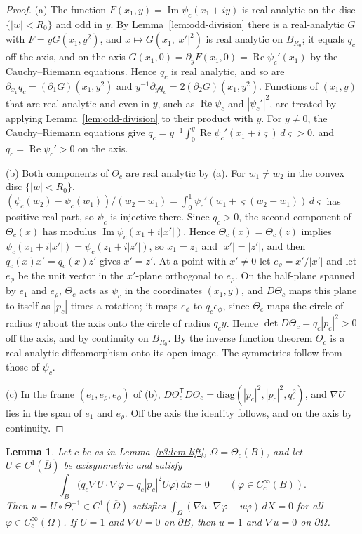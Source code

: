 \documentclass[11pt]{amsart}
\newtheorem{lemma}[theorem]{Lemma}
\theoremstyle{definition}
\theoremstyle{remark}
\numberwithin{equation}{section}
\DeclareMathOperator{\re}{Re}
\DeclareMathOperator{\im}{Im}
\begin{document}
\begin{proof}
(a) The function $F(x_1,y)=\im\psi_c(x_1+iy)$ is real analytic on the disc $\{|w|<R_0\}$ and odd in $y$. By Lemma~\ref{lem:odd-division} there is a real-analytic $G$ with $F=yG(x_1,y^2)$, and $x\mapsto G(x_1,|x'|^2)$ is real analytic on $B_{R_0}$; it equals $q_c$ off the axis, and on the axis $G(x_1,0)=\partial_yF(x_1,0)=\re\psi_c'(x_1)$ by the Cauchy--Riemann equations. Hence $q_c$ is real analytic, and so are $\partial_{x_1}q_c=(\partial_1G)(x_1,y^2)$ and $y^{-1}\partial_yq_c=2(\partial_2G)(x_1,y^2)$. Functions of $(x_1,y)$ that are real analytic and even in $y$, such as $\re\psi_c$ and $|\psi_c'|^2$, are treated by applying Lemma~\ref{lem:odd-division} to their product with $y$. For $y\neq0$, the Cauchy--Riemann equations give $q_c=y^{-1}\int_0^y\re\psi_c'(x_1+i\varsigma)\,d\varsigma>0$, and $q_c=\re\psi_c'>0$ on the axis.

(b) Both components of $\Theta_c$ are real analytic by (a). For $w_1\neq w_2$ in the convex disc $\{|w|<R_0\}$, $(\psi_c(w_2)-\psi_c(w_1))/(w_2-w_1)=\int_0^1\psi_c'(w_1+\varsigma(w_2-w_1))\,d\varsigma$ has positive real part, so $\psi_c$ is injective there. Since $q_c>0$, the second component of $\Theta_c(x)$ has modulus $\im\psi_c(x_1+i|x'|)$. Hence $\Theta_c(x)=\Theta_c(z)$ implies $\psi_c(x_1+i|x'|)=\psi_c(z_1+i|z'|)$, so $x_1=z_1$ and $|x'|=|z'|$, and then $q_c(x)x'=q_c(x)z'$ gives $x'=z'$. At a point with $x'\neq0$ let $e_\rho=x'/|x'|$ and let $e_\phi$ be the unit vector in the $x'$-plane orthogonal to $e_\rho$. On the half-plane spanned by $e_1$ and $e_\rho$, $\Theta_c$ acts as $\psi_c$ in the coordinates $(x_1,y)$, and $D\Theta_c$ maps this plane to itself as $|p_c|$ times a rotation; it maps $e_\phi$ to $q_ce_\phi$, since $\Theta_c$ maps the circle of radius $y$ about the axis onto the circle of radius $q_cy$. Hence $\det D\Theta_c=q_c|p_c|^2>0$ off the axis, and by continuity on $B_{R_0}$. By the inverse function theorem $\Theta_c$ is a real-analytic diffeomorphism onto its open image. The symmetries follow from those of $\psi_c$.

(c) In the frame $(e_1,e_\rho,e_\phi)$ of (b), $D\Theta_c^{\mathsf T}D\Theta_c=\mathrm{diag}(|p_c|^2,|p_c|^2,q_c^2)$, and $\nabla U$ lies in the span of $e_1$ and $e_\rho$. Off the axis the identity follows, and on the axis by continuity.
\end{proof}

\begin{lemma}\label{r3:lem-pullback}
Let $c$ be as in Lemma~\ref{r3:lem-lift}, $\Omega=\Theta_c(B)$, and let $U\in C^1(\overline B)$ be axisymmetric and satisfy
\begin{equation}\label{r3:eq-weakU}
\int_B\big(q_c\nabla U\cdot\nabla\varphi-q_c|p_c|^2U\varphi\big)\,dx=0\qquad(\varphi\in C^\infty_c(B)).
\end{equation}
Then $u=U\circ\Theta_c^{-1}\in C^1(\overline\Omega)$ satisfies $\int_\Omega(\nabla u\cdot\nabla\varphi-u\varphi)\,dX=0$ for all $\varphi\in C^\infty_c(\Omega)$. If $U=1$ and $\nabla U=0$ on $\partial B$, then $u=1$ and $\nabla u=0$ on $\partial\Omega$.
\end{lemma}
\end{document}
